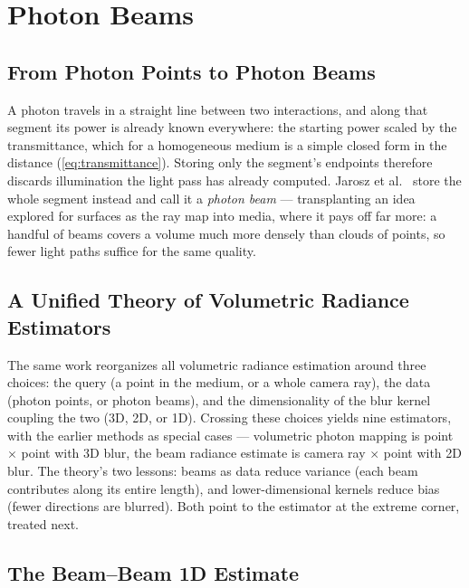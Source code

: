 \section{Photon Beams}
\subsection{From Photon Points to Photon Beams}

A photon travels in a straight line between two interactions, and along that segment its power is already known everywhere: the starting power scaled by the transmittance, which for a homogeneous medium is a simple closed form in the distance (\cref{eq:transmittance}). Storing only the segment's endpoints therefore discards illumination the light pass has already computed. Jarosz et al.\ \cite{jarosz11comprehensive} store the whole segment instead and call it a \emph{photon beam} --- transplanting an idea explored for surfaces as the ray map \cite{havran05raymap} into media, where it pays off far more: a handful of beams covers a volume much more densely than clouds of points, so fewer light paths suffice for the same quality.

\subsection{A Unified Theory of Volumetric Radiance Estimators}

The same work reorganizes all volumetric radiance estimation around three choices: the query (a point in the medium, or a whole camera ray), the data (photon points, or photon beams), and the dimensionality of the blur kernel coupling the two (3D, 2D, or 1D). Crossing these choices yields nine estimators, with the earlier methods as special cases --- volumetric photon mapping is point $\times$ point with 3D blur, the beam radiance estimate is camera ray $\times$ point with 2D blur. The theory's two lessons: beams as data reduce variance (each beam contributes along its entire length), and lower-dimensional kernels reduce bias (fewer directions are blurred). Both point to the estimator at the extreme corner, treated next.

\subsection{The Beam--Beam 1D Estimate}

